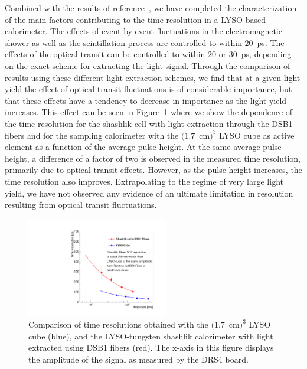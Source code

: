 \documentclass[12pt]{article}
\begin{document}
Combined with the results of reference~\cite{MCPFastCaloNIMA}, we 
have completed the characterization of the main factors
contributing to the time  resolution in a LYSO-based
calorimeter. The effects of event-by-event fluctuations in
the electromagnetic shower as well as the scintillation process 
are controlled to within $20$~ps. The effects of the optical transit
can be controlled to within $20$ or $30$~ps, depending on the
exact scheme for extracting the light signal. Through the comparison of results
using these different light extraction schemes, we find that at a 
given light yield the effect of optical transit fluctuations
is of considerable importance, but that these effects
have a tendency to decrease in importance as the light yield
increases. This effect can be seen in 
Figure~\ref{fig:ShashlikFiberAndCubeTOF} where we show
the dependence of the time resolution
for the shashlik cell with light extraction through the
DSB1 fibers and for the sampling calorimeter with the
$(1.7$~cm$)^{3}$ LYSO cube as active element as a function
of the average pulse height. At the same average pulse height,
a difference of a factor of two is observed in the
measured time  resolution, primarily due to
optical transit effects. However, as the pulse height
increases, the time  resolution also improves.
Extrapolating to the regime of very large light yield,
we have not observed any evidence of an
ultimate limitation in resolution resulting from
optical transit fluctuations.

\begin{figure}[H] \centering
\includegraphics[width=0.55\textwidth]{figs/TimeResolutionVsEnergy_ShashlikDSB1FiberAndCube} 
\caption{Comparison of time resolutions obtained with the $(1.7$~cm$)^{3}$ LYSO cube (blue), and the LYSO-tungsten shashlik calorimeter with light extracted using DSB1 fibers (red). The x-axis in this figure displays the amplitude of the signal as measured by the DRS4 board.}
\label{fig:ShashlikFiberAndCubeTOF}
\end{figure}
\end{document}
